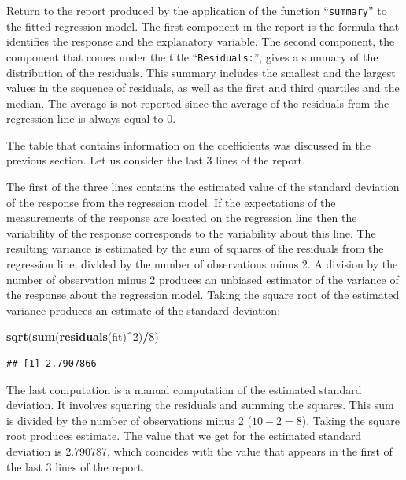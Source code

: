 \documentclass[]{krantz}
\makeatletter
\newenvironment{Shaded}{\begin{snugshade}}{\end{snugshade}}
\newcommand{\DecValTok}[1]{\textcolor[rgb]{0.00,0.00,0.81}{#1}}
\newcommand{\KeywordTok}[1]{\textcolor[rgb]{0.13,0.29,0.53}{\textbf{#1}}}
\newcommand{\NormalTok}[1]{#1}
\newcommand{\OperatorTok}[1]{\textcolor[rgb]{0.81,0.36,0.00}{\textbf{#1}}}
\newenvironment{kframe}{%
\medskip{}
\setlength{\fboxsep}{.8em}
 \def\at@end@of@kframe{}%
 \ifinner\ifhmode%
  \def\at@end@of@kframe{\end{minipage}}%
  \begin{minipage}{\columnwidth}%
 \fi\fi%
 \def\FrameCommand##1{\hskip\@totalleftmargin \hskip-\fboxsep
 \colorbox{shadecolor}{##1}\hskip-\fboxsep
     \hskip-\linewidth \hskip-\@totalleftmargin \hskip\columnwidth}%
 \MakeFramed {\advance\hsize-\width
   \@totalleftmargin\z@ \linewidth\hsize
   \@setminipage}}%
 {\par\unskip\endMakeFramed%
 \at@end@of@kframe}
\renewenvironment{Shaded}{\begin{kframe}}{\end{kframe}}
\theoremstyle{definition}
\theoremstyle{definition}
\theoremstyle{definition}
\theoremstyle{remark}
\makeatother
\begin{document}
Return to the report produced by the application of the function
``\texttt{summary}'' to the fitted regression model. The first component in the
report is the formula that identifies the response and the explanatory
variable. The second component, the component that comes under the title
``\texttt{Residuals:}'', gives a summary of the distribution of the residuals.
This summary includes the smallest and the largest values in the
sequence of residuals, as well as the first and third quartiles and the
median. The average is not reported since the average of the residuals
from the regression line is always equal to 0.

The table that contains information on the coefficients was discussed in
the previous section. Let us consider the last 3 lines of the report.

The first of the three lines contains the estimated value of the
standard deviation of the response from the regression model. If the
expectations of the measurements of the response are located on the
regression line then the variability of the response corresponds to the
variability about this line. The resulting variance is estimated by the
sum of squares of the residuals from the regression line, divided by the
number of observations minus 2. A division by the number of observation
minus 2 produces an unbiased estimator of the variance of the response
about the regression model. Taking the square root of the estimated
variance produces an estimate of the standard deviation:

\begin{Shaded}
\begin{Highlighting}[]
\KeywordTok{sqrt}\NormalTok{(}\KeywordTok{sum}\NormalTok{(}\KeywordTok{residuals}\NormalTok{(fit)}\OperatorTok{^}\DecValTok{2}\NormalTok{)}\OperatorTok{/}\DecValTok{8}\NormalTok{)}
\end{Highlighting}
\end{Shaded}

\begin{verbatim}
## [1] 2.7907866
\end{verbatim}

The last computation is a manual computation of the estimated standard
deviation. It involves squaring the residuals and summing the squares.
This sum is divided by the number of observations minus 2 (\(10-2=8\)).
Taking the square root produces estimate. The value that we get for the
estimated standard deviation is 2.790787, which coincides with the value
that appears in the first of the last 3 lines of the report.
\end{document}
